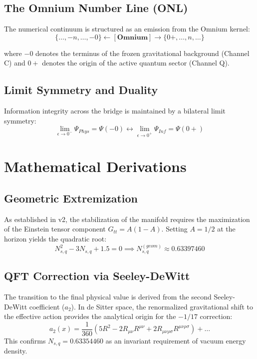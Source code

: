 \documentclass[11pt,a4paper,twocolumn]{article}
\begin{document}
\subsection{The Omnium Number Line (ONL)}
The numerical continuum is structured as an emission from the Omnium kernel:
\begin{equation}
    \{ \dots, -n, \dots, -0 \} \longleftarrow [\mathbf{Omnium}] \longrightarrow \{ 0+, \dots, n, \dots \}
\end{equation}

where $-0$ denotes the terminus of the frozen gravitational background (Channel C) and $0+$ denotes the origin of the active quantum sector (Channel Q). 

\subsection{Limit Symmetry and Duality}
Information integrity across the bridge is maintained by a bilateral limit symmetry:
\begin{equation}
    \lim_{\epsilon \to 0^-} \Psi_{Phys} = \Psi(-0) \longleftrightarrow \lim_{\epsilon \to 0^+} \Psi_{Inf} = \Psi(0+)
\end{equation}

\section{Mathematical Derivations}

\subsection{Geometric Extremization}
As established in v2, the stabilization of the manifold requires the maximization of the Einstein tensor component $G_{tt} = A(1-A)$. Setting $A=1/2$ at the horizon yields the quadratic root:
\begin{equation}
    N_{s,q}^2 - 3N_{s,q} + 1.5 = 0 \implies N_{s,q}^{(geom)} \approx 0.63397460
\end{equation}

\subsection{QFT Correction via Seeley-DeWitt}
The transition to the final physical value is derived from the second Seeley-DeWitt coefficient ($a_2$). In de Sitter space, the renormalized gravitational shift to the effective action provides the analytical origin for the $-1/17$ correction:
\begin{equation}
    a_2(x) = \frac{1}{360} (5R^2 - 2R_{\mu\nu}R^{\mu\nu} + 2R_{\mu\nu\rho\sigma}R^{\mu\nu\rho\sigma}) + \dots
\end{equation}
This confirms $N_{s,q} = 0.63354460$ as an invariant requirement of vacuum energy density.
\end{document}
